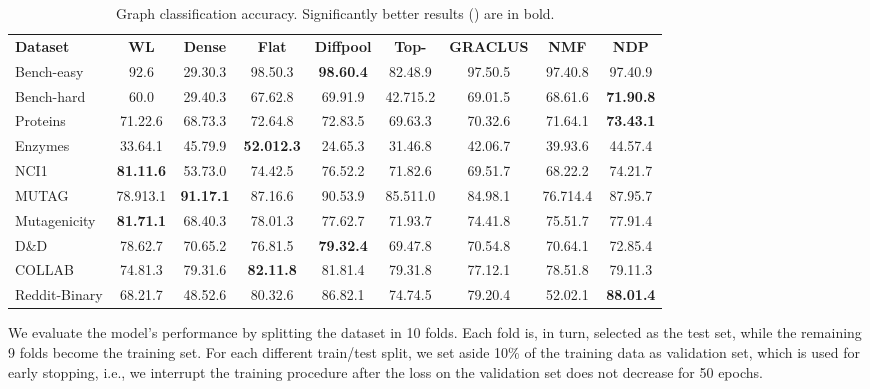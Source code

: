 \documentclass[journal]{IEEEtran}
\renewcommand{\t}[1]{\tiny{#1}}
\begin{document}
\bgroup
\def\arraystretch{1} \setlength\tabcolsep{1em} \begin{table*}[!ht]
\footnotesize
\centering
\caption{Graph classification accuracy. Significantly better results () are in bold.} 
\label{tab:graph_class}
\begin{tabular}{lcccccccc}
\cmidrule[1.5pt]{1-9}
\textbf{Dataset} & \textbf{WL} & \textbf{Dense} & \textbf{Flat} & \textbf{Diffpool} & \textbf{Top-}  & \textbf{GRACLUS} & \textbf{NMF} & \textbf{NDP}\\
\cmidrule[.5pt]{1-9}
Bench-easy    & 92.6 & 29.3\t{0.3} & 98.5\t{0.3} & \textbf{98.6\t{0.4}} & 82.4\t{8.9} & 97.5\t{0.5} & 97.4\t{0.8} & 97.4\t{0.9}\\ Bench-hard    & 60.0 & 29.4\t{0.3} & 67.6\t{2.8} & 69.9\t{1.9} & 42.7\t{15.2}  & 69.0\t{1.5} & 68.6\t{1.6} & \textbf{71.9\t{0.8}}\\  Proteins      & 71.2\t{2.6}  & 68.7\t{3.3} & 72.6\t{4.8} & 72.8\t{3.5} & 69.6\t{3.3} & 70.3\t{2.6} & 71.6\t{4.1} & \textbf{73.4\t{3.1}}\\ Enzymes       & 33.6\t{4.1}  & 45.7\t{9.9} & \textbf{52.0\t{12.3}} & 24.6\t{5.3} & 31.4\t{6.8} & 42.0\t{6.7} & 39.9\t{3.6} & 44.5\t{7.4}\\ NCI1          & \textbf{81.1\t{1.6}}  & 53.7\t{3.0} & 74.4\t{2.5} & 76.5\t{2.2} & 71.8\t{2.6} & 69.5\t{1.7} & 68.2\t{2.2} & 74.2\t{1.7}\\ MUTAG         & 78.9\t{13.1} & \textbf{91.1\t{7.1}} & 87.1\t{6.6} & 90.5\t{3.9} & 85.5\t{11.0} & 84.9\t{8.1} & 76.7\t{14.4} & 87.9\t{5.7}\\ Mutagenicity  & \textbf{81.7\t{1.1}}  & 68.4\t{0.3} & 78.0\t{1.3} & 77.6\t{2.7} & 71.9\t{3.7} & 74.4\t{1.8} & 75.5\t{1.7} & 77.9\t{1.4}\\ D\&D          & 78.6\t{2.7}  & 70.6\t{5.2} & 76.8\t{1.5} & \textbf{79.3\t{2.4}} & 69.4\t{7.8} & 70.5\t{4.8} & 70.6\t{4.1} & 72.8\t{5.4}\\ COLLAB        & 74.8\t{1.3}  & 79.3\t{1.6} & \textbf{82.1\t{1.8}} & 81.8\t{1.4} & 79.3\t{1.8} & 77.1\t{2.1} & 78.5\t{1.8} & 79.1\t{1.3} \\ Reddit-Binary & 68.2\t{1.7}  & 48.5\t{2.6} & 80.3\t{2.6} & 86.8\t{2.1} & 74.7\t{4.5} & 79.2\t{0.4} & 52.0\t{2.1} & \textbf{88.0\t{1.4}} \\ \cmidrule[1.5pt]{1-9}
\end{tabular}
\end{table*}
\egroup

We evaluate the model's performance by splitting the dataset in 10 folds. 
Each fold is, in turn, selected as the test set, while the remaining 9 folds become the training set.
For each different train/test split, we set aside 10\% of the training data as validation set, which is used for early stopping, i.e., we interrupt the training procedure after the loss on the validation set does not decrease for 50 epochs.
\end{document}
